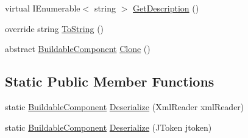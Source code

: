 \begin{DoxyCompactItemize}
\item 
virtual I\+Enumerable$<$ string $>$ \hyperlink{class_project_porcupine_1_1_buildable_1_1_components_1_1_buildable_component_a78dcaf17ccd463eb4f47fc4b3671b7b5}{Get\+Description} ()
\item 
override string \hyperlink{class_project_porcupine_1_1_buildable_1_1_components_1_1_buildable_component_a72c9ae31770dff072e2ed330ab998f6a}{To\+String} ()
\item 
abstract \hyperlink{class_project_porcupine_1_1_buildable_1_1_components_1_1_buildable_component}{Buildable\+Component} \hyperlink{class_project_porcupine_1_1_buildable_1_1_components_1_1_buildable_component_acfe1aedeaf167118ca5d0d2b046e00fb}{Clone} ()
\end{DoxyCompactItemize}
\subsection*{Static Public Member Functions}
\begin{DoxyCompactItemize}
\item 
static \hyperlink{class_project_porcupine_1_1_buildable_1_1_components_1_1_buildable_component}{Buildable\+Component} \hyperlink{class_project_porcupine_1_1_buildable_1_1_components_1_1_buildable_component_a0d0366b27cc355c8c02b99de39b2ae3f}{Deserialize} (Xml\+Reader xml\+Reader)
\item 
static \hyperlink{class_project_porcupine_1_1_buildable_1_1_components_1_1_buildable_component}{Buildable\+Component} \hyperlink{class_project_porcupine_1_1_buildable_1_1_components_1_1_buildable_component_a849bec823484ae994bbdb47f5d8776ac}{Deserialize} (J\+Token jtoken)
\end{DoxyCompactItemize}
